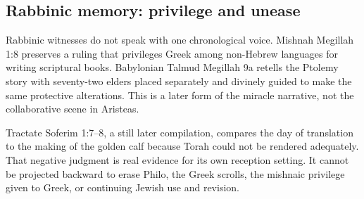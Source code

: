 \subsection{Rabbinic memory: privilege and unease}

Rabbinic witnesses do not speak with one chronological voice. Mishnah Megillah 1:8 preserves a ruling that privileges Greek among non-Hebrew languages for writing scriptural books. Babylonian Talmud Megillah 9a retells the Ptolemy story with seventy-two elders placed separately and divinely guided to make the same protective alterations. This is a later form of the miracle narrative, not the collaborative scene in Aristeas.

Tractate Soferim 1:7--8, a still later compilation, compares the day of translation to the making of the golden calf because Torah could not be rendered adequately. That negative judgment is real evidence for its own reception setting. It cannot be projected backward to erase Philo, the Greek scrolls, the mishnaic privilege given to Greek, or continuing Jewish use and revision.

